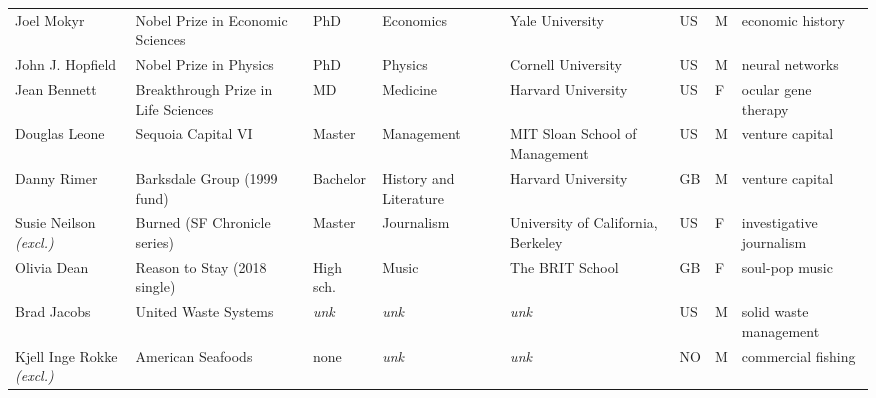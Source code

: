 \documentclass[11pt]{article}
\begin{document}
\begin{longtable}{@{}p{2.4cm}p{2.5cm}p{1.35cm}p{1.9cm}p{2.1cm}p{0.5cm}p{0.45cm}p{2.2cm}@{}}
Joel Mokyr & Nobel Prize in Economic Sciences & PhD & Economics & Yale University & US & M & economic history \\
John J. Hopfield & Nobel Prize in Physics & PhD & Physics & Cornell University & US & M & neural networks \\
Jean Bennett & Breakthrough Prize in Life Sciences & MD & Medicine & Harvard University & US & F & ocular gene therapy \\
Douglas Leone & Sequoia Capital VI & Master & Management & MIT Sloan School of Management & US & M & venture capital \\
Danny Rimer & Barksdale Group (1999 fund) & Bachelor & History and Literature & Harvard University & GB & M & venture capital \\
Susie Neilson \textit{\scriptsize(excl.)} & Burned (SF Chronicle series) & Master & Journalism & University of California, Berkeley & US & F & investigative journalism \\
Olivia Dean & Reason to Stay (2018 single) & High sch. & Music & The BRIT School & GB & F & soul-pop music \\
Brad Jacobs & United Waste Systems & \textit{unk} & \textit{unk} & \textit{unk} & US & M & solid waste management \\
Kjell Inge Rokke \textit{\scriptsize(excl.)} & American Seafoods & none & \textit{unk} & \textit{unk} & NO & M & commercial fishing \\
\bottomrule
\end{longtable}
\normalsize
\end{document}
